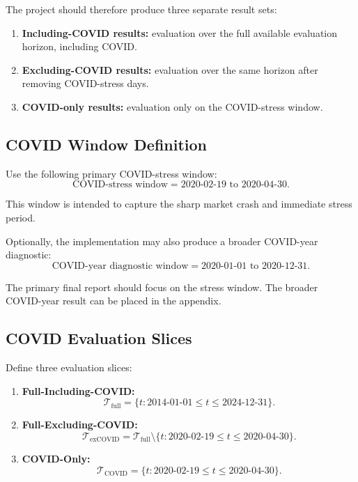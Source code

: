 \documentclass[11pt]{article}
\begin{document}
The project should therefore produce three separate result sets:

\begin{enumerate}
    \item \textbf{Including-COVID results:} evaluation over the full available evaluation horizon, including COVID.
    \item \textbf{Excluding-COVID results:} evaluation over the same horizon after removing COVID-stress days.
    \item \textbf{COVID-only results:} evaluation only on the COVID-stress window.
\end{enumerate}

\subsection{COVID Window Definition}

Use the following primary COVID-stress window:
\[
\text{COVID-stress window} = \text{2020-02-19 to 2020-04-30}.
\]

This window is intended to capture the sharp market crash and immediate stress period.

Optionally, the implementation may also produce a broader COVID-year diagnostic:
\[
\text{COVID-year diagnostic window} = \text{2020-01-01 to 2020-12-31}.
\]

The primary final report should focus on the stress window. The broader COVID-year result can be placed in the appendix.

\subsection{COVID Evaluation Slices}

Define three evaluation slices:

\begin{enumerate}
    \item \textbf{Full-Including-COVID:}
    \[
    \mathcal{T}_{\text{full}} = \{t: 2014\text{-}01\text{-}01 \leq t \leq 2024\text{-}12\text{-}31\}.
    \]

    \item \textbf{Full-Excluding-COVID:}
    \[
    \mathcal{T}_{\text{exCOVID}} =
    \mathcal{T}_{\text{full}}
    \setminus
    \{t: 2020\text{-}02\text{-}19 \leq t \leq 2020\text{-}04\text{-}30\}.
    \]

    \item \textbf{COVID-Only:}
    \[
    \mathcal{T}_{\text{COVID}} =
    \{t: 2020\text{-}02\text{-}19 \leq t \leq 2020\text{-}04\text{-}30\}.
    \]
\end{enumerate}
\end{document}
